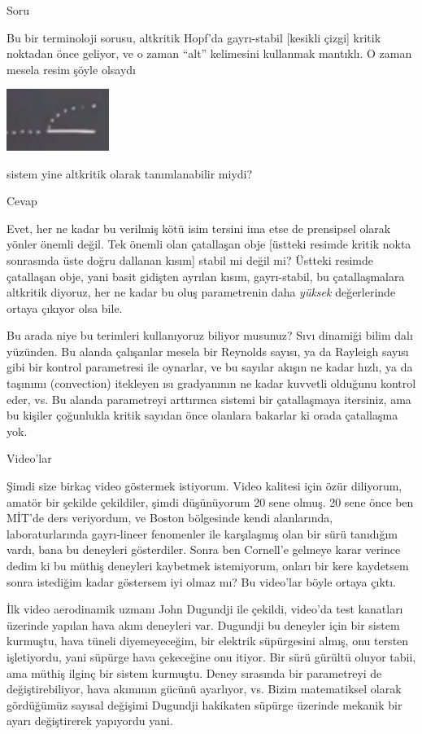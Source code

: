 \documentclass[12pt,fleqn]{article}\usepackage{../../common}
\begin{document}
Soru

Bu bir terminoloji sorusu, altkritik Hopf'da gayrı-stabil [kesikli çizgi]
kritik noktadan önce geliyor, ve o zaman ``alt'' kelimesini kullanmak
mantıklı. O zaman mesela resim şöyle olsaydı

\includegraphics[height=2cm]{13_11.png}

sistem yine altkritik olarak tanımlanabilir miydi? 

Cevap

Evet, her ne kadar bu verilmiş kötü isim tersini ima etse de prensipsel
olarak yönler önemli değil. Tek önemli olan çatallaşan obje [üstteki
resimde kritik nokta sonrasında üste doğru dallanan kısım] stabil mi değil
mi? Üstteki resimde çatallaşan obje, yani basit gidişten ayrılan kısım,
gayrı-stabil, bu çatallaşmalara altkritik diyoruz, her ne kadar bu oluş
parametrenin daha {\em yüksek} değerlerinde ortaya çıkıyor olsa bile.

Bu arada niye bu terimleri kullanıyoruz biliyor musunuz? Sıvı dinamiği
bilim dalı yüzünden. Bu alanda çalışanlar mesela bir Reynolds sayısı, ya da
Rayleigh sayısı gibi bir kontrol parametresi ile oynarlar, ve bu sayılar
akışın ne kadar hızlı, ya da taşınımı (convection) itekleyen ısı
gradyanının ne kadar kuvvetli olduğunu kontrol eder, vs. Bu alanda
parametreyi arttırınca sistemi bir çatallaşmaya itersiniz, ama bu kişiler
çoğunlukla kritik sayıdan önce olanlara bakarlar ki orada çatallaşma yok.

Video'lar

Şimdi size birkaç video göstermek istiyorum. Video kalitesi için özür diliyorum,
amatör bir şekilde çekildiler, şimdi düşünüyorum 20 sene olmuş. 20 sene önce ben
MİT'de ders veriyordum, ve Boston bölgesinde kendi alanlarında, laboraturlarında
gayrı-lineer fenomenler ile karşılaşmış olan bir sürü tanıdığım vardı, bana bu
deneyleri gösterdiler. Sonra ben Cornell'e gelmeye karar verince dedim ki bu
müthiş deneyleri kaybetmek istemiyorum, onları bir kere kaydetsem sonra
istediğim kadar göstersem iyi olmaz mı? Bu video'lar böyle ortaya çıktı.

İlk video aerodinamik uzmanı John Dugundji ile çekildi, video'da test
kanatları üzerinde yapılan hava akım deneyleri var. Dugundji bu deneyler
için bir sistem kurmuştu, hava tüneli diyemeyeceğim, bir elektrik
süpürgesini almış, onu tersten işletiyordu, yani süpürge hava çekeceğine
onu itiyor. Bir sürü gürültü oluyor tabii, ama müthiş ilginç bir sistem
kurmuştu. Deney sırasında bir parametreyi de değiştirebiliyor, hava
akımının gücünü ayarlıyor, vs. Bizim matematiksel olarak gördüğümüz sayısal
değişimi Dugundji hakikaten süpürge üzerinde mekanik bir ayarı değiştirerek
yapıyordu yani.
\end{document}
